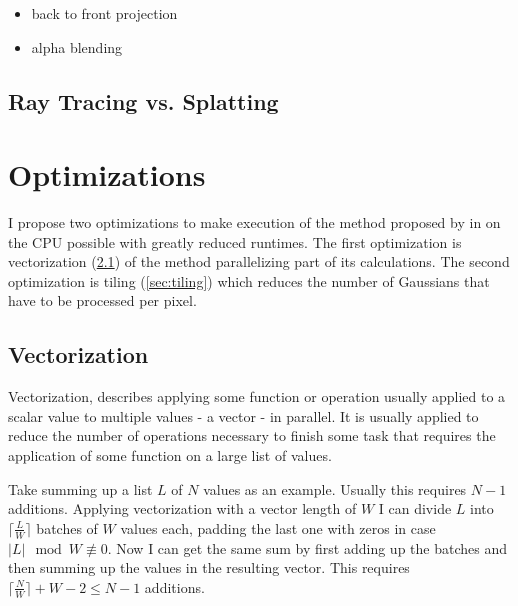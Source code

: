 \documentclass[a4paper, 11pt]{memoir}
\begin{document}
    \begin{itemize}
        \item back to front projection
        \item alpha blending
    \end{itemize}

    \section{Ray Tracing vs. Splatting}

    \chapter{Optimizations}
    \label{ch:optimizations}
    I propose two optimizations to make execution of the method proposed by \citeauthor{Rhodin:2015}
    in \cite{Rhodin:2015} on the CPU possible with greatly reduced runtimes.
    The first optimization is vectorization (\ref{sec:vectorization}) of the method
    parallelizing part of its calculations.
    The second optimization is tiling (\ref{sec:tiling}) which reduces the number of Gaussians
    that have to be processed per pixel.

    \section{Vectorization}
    \label{sec:vectorization}
    Vectorization, describes applying some function or operation usually applied to a scalar value
    to multiple values - a vector - in parallel.
    It is usually applied to reduce the number of operations necessary to finish some task that
    requires the application of some function on a large list of values.

    Take summing up a list $L$ of $N$ values as an example. Usually this requires $N - 1$ additions.
    Applying vectorization with a vector length of $W$ I can divide $L$ into $\lceil \frac{L}{W} \rceil$
    batches of $W$ values each, padding the last one with zeros in case $|L| \mod W \not\equiv 0$. Now I
    can get the same sum by first adding up the batches and then summing up the values in the resulting
    vector. This requires $\lceil \frac{N}{W} \rceil + W - 2 \leq N - 1$ additions.
\end{document}
